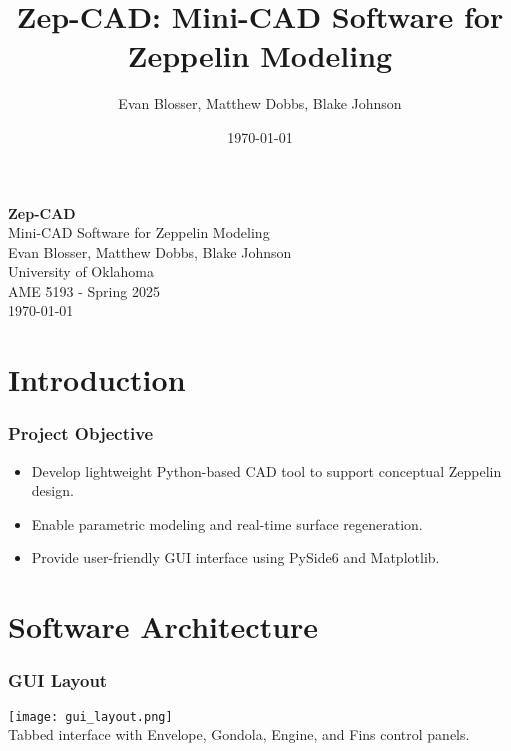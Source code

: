 \documentclass{beamer}
\title[Zep-CAD Project]{Zep-CAD: Mini-CAD Software for Zeppelin Modeling}
\author{Evan Blosser, Matthew Dobbs, Blake Johnson}
\institute{University of Oklahoma \\ AME 5193 - Spring 2025}
\date{\today}
\begin{document}
\begin{frame}[plain]
    \centering
    \vspace{2cm}
    {\Huge \color{white} \textbf{Zep-CAD}}\\[0.5cm]
    {\Large \color{white} Mini-CAD Software for Zeppelin Modeling}\\[2cm]
    {\large \color{white} Evan Blosser, Matthew Dobbs, Blake Johnson}\\
    {\small \color{white} University of Oklahoma \\ AME 5193 - Spring 2025}\\
    \vfill
    {\small \color{white} \today}
\end{frame}



\section{Introduction}
\begin{frame}
    \frametitle{Project Objective}
    \begin{itemize}
        \item Develop lightweight Python-based CAD tool to support conceptual Zeppelin design.
        \item Enable parametric modeling and real-time surface regeneration.
        \item Provide user-friendly GUI interface using PySide6 and Matplotlib.
    \end{itemize}
\end{frame}

\section{Software Architecture}
\begin{frame}
    \frametitle{GUI Layout}
    \texttt{[image: gui\_layout.png]}\\[0.5em]
    \small Tabbed interface with Envelope, Gondola, Engine, and Fins control panels.
\end{frame}
\end{document}
